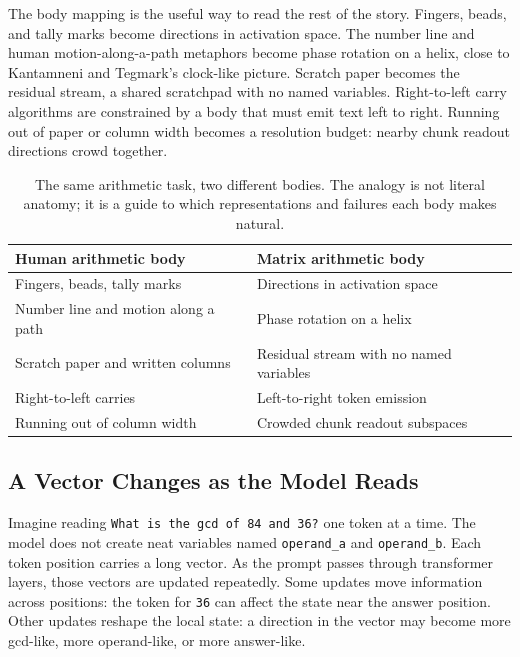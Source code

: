 \documentclass[acmsmall,screen,nonacm]{acmart}
\begin{document}
The body mapping is the useful way to read the rest of the story. Fingers,
beads, and tally marks become directions in activation space. The number line
and human motion-along-a-path metaphors become phase rotation on a helix, close
to Kantamneni and Tegmark's clock-like picture. Scratch paper becomes the
residual stream, a shared scratchpad with no named variables. Right-to-left
carry algorithms are constrained by a body that must emit text left to right.
Running out of paper or column width becomes a resolution budget: nearby chunk
readout directions crowd together.

\begin{table}[t]
  \caption{The same arithmetic task, two different bodies. The analogy is not
  literal anatomy; it is a guide to which representations and failures each body
  makes natural.}
  \label{tab:bodymap}
  \centering
  \begin{tabularx}{\linewidth}{XX}
    \toprule
    Human arithmetic body & Matrix arithmetic body \\
    \midrule
    Fingers, beads, tally marks & Directions in activation space \\
    Number line and motion along a path & Phase rotation on a helix \\
    Scratch paper and written columns & Residual stream with no named variables \\
    Right-to-left carries & Left-to-right token emission \\
    Running out of column width & Crowded chunk readout subspaces \\
    \bottomrule
  \end{tabularx}
\end{table}

\subsection{A Vector Changes as the Model Reads}

Imagine reading \texttt{What is the gcd of 84 and 36?} one token at a time. The
model does not create neat variables named \texttt{operand\_a} and
\texttt{operand\_b}. Each token position carries a long vector. As the prompt
passes through transformer layers, those vectors are updated repeatedly. Some
updates move information across positions: the token for \texttt{36} can affect
the state near the answer position. Other updates reshape the local state: a
direction in the vector may become more gcd-like, more operand-like, or more
answer-like.
\end{document}
